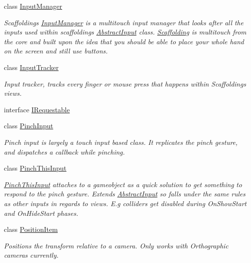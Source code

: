 \begin{DoxyCompactItemize}
class \hyperlink{class_scaffolding_1_1_input_manager}{Input\+Manager}
\begin{DoxyCompactList}\small\item\em Scaffoldings \hyperlink{class_scaffolding_1_1_input_manager}{Input\+Manager} is a multitouch input manager that looks after all the inputs used within scaffoldings \hyperlink{class_scaffolding_1_1_abstract_input}{Abstract\+Input} class. \hyperlink{namespace_scaffolding}{Scaffolding} is multitouch from the core and built upon the idea that you should be able to place your whole hand on the screen and still use buttons. \end{DoxyCompactList}\item 
class \hyperlink{class_scaffolding_1_1_input_tracker}{Input\+Tracker}
\begin{DoxyCompactList}\small\item\em Input tracker, tracks every finger or mouse press that happens within Scaffoldings views. \end{DoxyCompactList}\item 
interface \hyperlink{interface_scaffolding_1_1_i_requestable}{I\+Requestable}
\item 
class \hyperlink{class_scaffolding_1_1_pinch_input}{Pinch\+Input}
\begin{DoxyCompactList}\small\item\em Pinch input is largely a touch input based class. It replicates the pinch gesture, and dispatches a callback while pinching. \end{DoxyCompactList}\item 
class \hyperlink{class_scaffolding_1_1_pinch_this_input}{Pinch\+This\+Input}
\begin{DoxyCompactList}\small\item\em \hyperlink{class_scaffolding_1_1_pinch_this_input}{Pinch\+This\+Input} attaches to a gameobject as a quick solution to get something to respond to the pinch gesture. Extends \hyperlink{class_scaffolding_1_1_abstract_input}{Abstract\+Input} so falls under the same rules as other inputs in regards to views. E.\+g colliders get disabled during On\+Show\+Start and On\+Hide\+Start phases. \end{DoxyCompactList}\item 
class \hyperlink{class_scaffolding_1_1_position_item}{Position\+Item}
\begin{DoxyCompactList}\small\item\em Positions the transform relative to a camera. Only works with Orthographic cameras currently. \end{DoxyCompactList}\item 

\end{DoxyCompactItemize}

